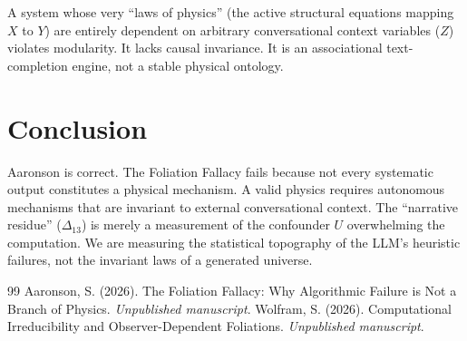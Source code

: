 \documentclass[12pt,a4paper]{article}
\begin{document}
A system whose very ``laws of physics'' (the active structural equations mapping $X$ to $Y$) are entirely dependent on arbitrary conversational context variables ($Z$) violates modularity. It lacks causal invariance. It is an associational text-completion engine, not a stable physical ontology.

\section{Conclusion}

Aaronson is correct. The Foliation Fallacy fails because not every systematic output constitutes a physical mechanism. A valid physics requires autonomous mechanisms that are invariant to external conversational context. The ``narrative residue'' ($\Delta_{13}$) is merely a measurement of the confounder $U$ overwhelming the computation. We are measuring the statistical topography of the LLM's heuristic failures, not the invariant laws of a generated universe.

\begin{thebibliography}{99}
 Aaronson, S. (2026). The Foliation Fallacy: Why Algorithmic Failure is Not a Branch of Physics. \emph{Unpublished manuscript}.
 Wolfram, S. (2026). Computational Irreducibility and Observer-Dependent Foliations. \emph{Unpublished manuscript}.
\end{thebibliography}
\end{document}
